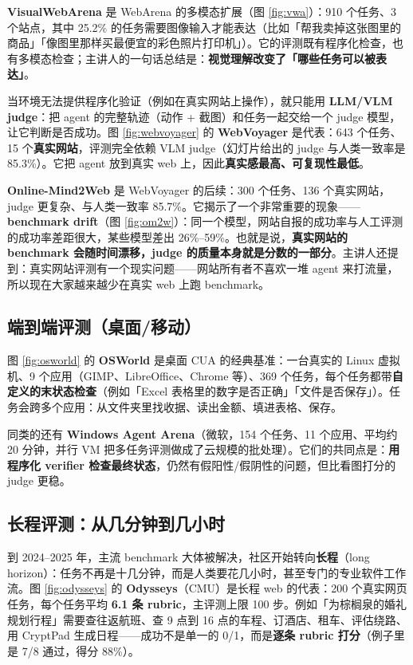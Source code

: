 ﻿\documentclass[a4paper]{article}
\begin{document}
\textbf{VisualWebArena} 是 WebArena 的多模态扩展（图 \ref{fig:vwa}）：910 个任务、3 个站点，其中 25.2\% 的任务需要图像输入才能表达（比如「帮我卖掉这张图里的商品」「像图里那样买最便宜的彩色照片打印机」）。它的评测既有程序化检查，也有多模态检查；主讲人的一句话总结是：\textbf{视觉理解改变了「哪些任务可以被表达」}。

当环境无法提供程序化验证（例如在真实网站上操作），就只能用 \textbf{LLM/VLM judge}：把 agent 的完整轨迹（动作 + 截图）和任务一起交给一个 judge 模型，让它判断是否成功。图 \ref{fig:webvoyager} 的 \textbf{WebVoyager} 是代表：643 个任务、15 个\textbf{真实网站}，评测完全依赖 VLM judge（幻灯片给出的 judge 与人类一致率是 85.3\%）。它把 agent 放到真实 web 上，因此\textbf{真实感最高、可复现性最低}。

\textbf{Online-Mind2Web} 是 WebVoyager 的后续：300 个任务、136 个真实网站，judge 更复杂、与人类一致率 85.7\%。它揭示了一个非常重要的现象——\textbf{benchmark drift}（图 \ref{fig:om2w}）：同一个模型，网站自报的成功率与人工评测的成功率差距很大，某些模型差出 26\%–59\%。也就是说，\textbf{真实网站的 benchmark 会随时间漂移，judge 的质量本身就是分数的一部分}。主讲人还提到：真实网站评测有一个现实问题——网站所有者不喜欢一堆 agent 来打流量，所以现在大家越来越少在真实 web 上跑 benchmark。

\subsection{端到端评测（桌面/移动）}

图 \ref{fig:osworld} 的 \textbf{OSWorld} 是桌面 CUA 的经典基准：一台真实的 Linux 虚拟机、9 个应用（GIMP、LibreOffice、Chrome 等）、369 个任务，每个任务都带\textbf{自定义的末状态检查}（例如「Excel 表格里的数字是否正确」「文件是否保存」）。任务会跨多个应用：从文件夹里找收据、读出金额、填进表格、保存。

同类的还有 \textbf{Windows Agent Arena}（微软，154 个任务、11 个应用、平均约 20 分钟，并行 VM 把多任务评测做成了云规模的批处理）。它们的共同点是：\textbf{用程序化 verifier 检查最终状态}，仍然有假阳性/假阴性的问题，但比看图打分的 judge 更稳。

\subsection{长程评测：从几分钟到几小时}

到 2024–2025 年，主流 benchmark 大体被解决，社区开始转向\textbf{长程}（long horizon）：任务不再是十几分钟，而是人类要花几小时，甚至专门的专业软件工作流。图 \ref{fig:odysseys} 的 \textbf{Odysseys}（CMU）是长程 web 的代表：200 个真实网页任务，每个任务平均 \textbf{6.1 条 rubric}，主评测上限 100 步。例如「为棕榈泉的婚礼规划行程」需要查往返航班、查 9 点到 16 点的车程、订酒店、租车、评估绕路、用 CryptPad 生成日程——成功不是单一的 0/1，而是\textbf{逐条 rubric 打分}（例子里是 7/8 通过，得分 88\%）。
\end{document}
